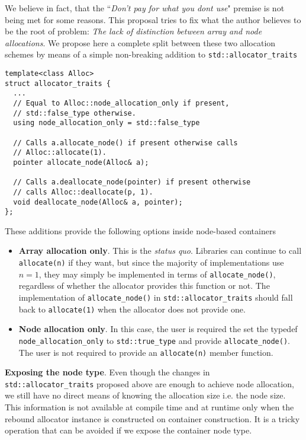 \documentclass[11pt]{article}
\begin{document}
We believe in fact, that the ``{\it Don't pay for what you dont use}" premise
is not being met for some reasons. This proposal tries to fix what the author
believes to be the root of problem: {\it The lack of distinction between array
and node allocations}.  We propose here a complete split between these
two allocation schemes by means of a simple non-breaking addition to
\texttt{std::allocator\_traits}
\medskip
\begin{lstlisting}
template<class Alloc>
struct allocator_traits {
  ...
  // Equal to Alloc::node_allocation_only if present,
  // std::false_type otherwise.
  using node_allocation_only = std::false_type

  // Calls a.allocate_node() if present otherwise calls
  // Alloc::allocate(1).
  pointer allocate_node(Alloc& a);

  // Calls a.deallocate_node(pointer) if present otherwise
  // calls Alloc::deallocate(p, 1).
  void deallocate_node(Alloc& a, pointer);
};
\end{lstlisting}
These additions provide the following options inside node-based
containers
\begin{itemize}
\item {\bf Array allocation only}.
This is the {\it status quo}. Libraries can continue to call
\texttt{allocate(n)} if they want, but since the majority of implementations
use $n = 1$, they may simply be implemented in terms of
\texttt{allocate\_node()}, regardless of whether the allocator provides this
function or not. The implementation of \texttt{allocate\_node()} in
\texttt{std::allocator\_traits} should fall back to \texttt{allocate(1)} 
when the allocator does not provide one.

\item {\bf Node allocation only}.
In this case, the user is required the set the typedef \texttt{node\_allocation\_only}
to \texttt{std::true\_type} and provide \texttt{allocate\_node()}. The user is
not required to provide an \texttt{allocate(n)} member function.
\end{itemize}

\medskip
\noindent
{\bf Exposing the node type}. Even though the changes in \\
\texttt{std::allocator\_traits} proposed above are enough to achieve node
allocation, we still have no direct means of knowing the allocation size
i.e. the node size. This information is not available at compile time and
at runtime only when the rebound allocator instance is constructed on
container construction. It is a tricky operation that can be avoided
if we expose the container node type.
\end{document}
